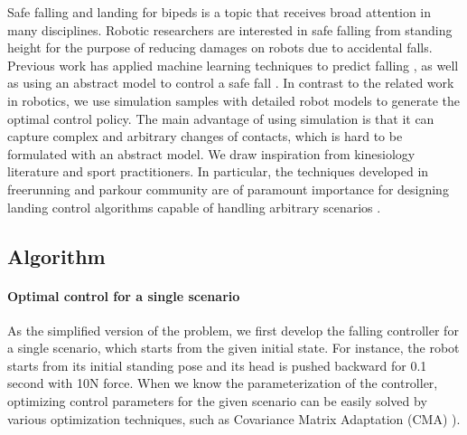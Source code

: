 Safe falling and landing for bipeds is a topic that
receives broad attention in many disciplines. Robotic researchers are
interested in safe falling from standing height for the purpose of
reducing damages on robots due to accidental falls. Previous work has
applied machine learning techniques to predict falling
\cite{Kalyanakrishnan:2011:LPH}, as well as using an abstract model to
control a safe fall
\cite{Fujiwara:2002:FMC,Fujiwara:2007:OPF,Yun:2009:SFH}. 
In contrast to the related work in robotics, we use simulation samples
with detailed robot models to generate the optimal control policy.
The main advantage of using simulation is that it can capture
complex and arbitrary changes of contacts, which is hard to be 
formulated with an abstract model.
We draw inspiration from kinesiology literature and sport practitioners. 
In particular, the techniques developed in freerunning and parkour 
community are of paramount importance for designing landing control 
algorithms capable of handling arbitrary scenarios
\cite{Edwardes:2009:TPF,HLJ:2011:URL}. 

\subsection{Algorithm}

\paragraph{Optimal control for a single scenario}
As the simplified version of the problem, we first develop the falling
controller for a single scenario, which starts from the given initial 
state.
For instance, the robot starts from its initial standing pose and 
its head is pushed backward for 0.1 second with 10N force.
When we know the parameterization of the controller, optimizing
control parameters for the given scenario can be easily solved
by various optimization techniques, such as 
Covariance Matrix Adaptation (CMA) \cite{Hansen:2004:CMA}).

